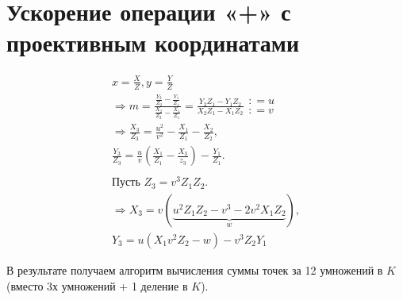 \documentclass[12pt]{article}
\theoremstyle{definition}
\theoremstyle{definition}
\theoremstyle{definition}
\begin{document}
\section{Ускорение операции «+» с проективным координатами}
\begin{gather*}
    x = \frac{X}{Z}, y = \frac{Y}{Z}\\
    \Rightarrow m = \frac{\frac{Y_2}{Z_2} - \frac{Y_1}{Z_1}}{\frac{X_2}{Z_2} - \frac{X_1}{Z_1}} = \frac{Y_2 Z_1 - Y_1 Z_2}{X_2 Z_1 - X_1 Z_2}
    \begin{array}{*{20}{c}}
    {: = u} \\ 
    {: = v} 
    \end{array} \\
    \Rightarrow \frac{X_3}{Z_3} = \frac{u^2}{v^2} - \frac{X_1}{Z_1} - \frac{X_2}{Z_2}, \\
    \frac{Y_3}{Z_3} = \frac{u}{v}\left(\frac{X_1}{Z_1} - \frac{X_3}{z_3}\right) - \frac{Y_1}{Z_1}.\\\\
    \text{Пусть } Z_3 = v^3 Z_1 Z_2. \\
    \Rightarrow {X_3} = v(\underbrace{u^2 Z_1 Z_2 - v^3 - 2 v^2 X_1 Z_2}_w), \\
    Y_3 = u(X_1 v^2 Z_2 - w) - v^3 Z_2 Y_1
\end{gather*}

	В результате получаем алгоритм вычисления суммы точек за 12 умножений в $K$ (вместо 3х умножений + 1 деление в $K$).

\nocite{Menezes1993, Blake1999, Washington2008, Silverman2009}
\printbibliography
\end{document}
